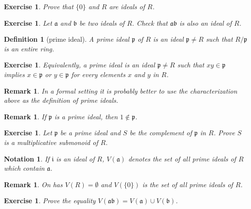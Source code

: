 \documentclass[12pt]{article}
\newtheorem{definition}[proposition]{Definition}
\newtheorem{remark}[proposition]{Remark}
\newtheorem{ex}[proposition]{Exercise}
\newtheorem{notation}{Notation}
\begin{document}
\begin{ex}
	Prove that $\lbrace 0 \rbrace$ and $R$ are ideals of $R$.
\end{ex}

\begin{ex}
	Let $\mathfrak{a}$ and $\mathfrak{b}$ be two ideals of $R$. Check that $\mathfrak{a} \mathfrak{b}$ is also an ideal of $R$.
\end{ex}
		
\begin{definition}[prime ideal]
	A prime ideal $\mathfrak{p}$ of $R$ is an ideal $\mathfrak{p} \neq R$ such that $R/\mathfrak{p}$ is an entire ring. 	
\end{definition}

\begin{ex}
	Equivalently, a prime ideal is an ideal $\mathfrak{p} \neq R$ such that $x y \in \mathfrak{p}$ implies $x \in \mathfrak{p}$ or $y \in \mathfrak{p}$ for every elements $x$ and $y$ in $R$.
\end{ex}

\begin{remark}
	In a formal setting it is probably better to use the characterization above as the definition of prime ideals.
\end{remark}

\begin{remark}
	If $\mathfrak{p}$ is a prime ideal, then $1 \notin \mathfrak{p}$.
\end{remark}

\begin{ex}
	Let $\mathfrak{p}$ be a prime ideal and $S$ be the complement of $\mathfrak{p}$ in $R$. Prove $S$ is a multiplicative submonoid of $R$. 
\end{ex}		

\begin{notation}
	If $\mathfrak{i}$ is an ideal of $R$, $V(\mathfrak{a})$ denotes the set of all prime ideals of $R$ which contain $\mathfrak{a}$. 
\end{notation}

\begin{remark}
	On has $V(R) = \emptyset$ and $V(\lbrace 0 \rbrace)$ is the set of all prime ideals of $R$.
\end{remark}	

\begin{ex}
Prove the equality $V(\mathfrak{a} \mathfrak{b}) = V(\mathfrak{a}) \cup V(\mathfrak{b})$.	
\end{ex}
\end{document}
